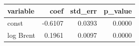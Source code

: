 \begin{tabular}{lrrr}
\toprule
variable & coef & std\_err & p\_value \\
\midrule
const & -0.6107 & 0.0393 & 0.0000 \\
log Brent & 0.1961 & 0.0097 & 0.0000 \\
\bottomrule
\end{tabular}
